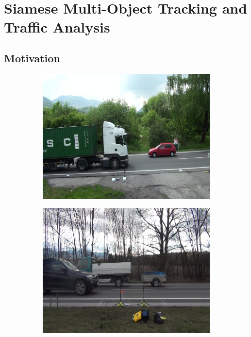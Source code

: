 \section{Siamese Multi-Object Tracking and Traffic Analysis}
\label{sec:SiamMOTTrafficAnalysis}

\subsection{Motivation}

\begin{figure}[!t]
    \centering
    \begin{subfigure}[b]{0.4\textwidth}
        \centering
        \includegraphics[width=\textwidth]{figures/siamese_tracking/interreg_sample_01.jpg}
        \caption[]{}
    \end{subfigure}
    \begin{subfigure}[b]{0.4\textwidth}
        \centering
        \includegraphics[width=\textwidth]{figures/siamese_tracking/interreg_sample_02.jpg}

\end{subfigure}
\end{figure}
